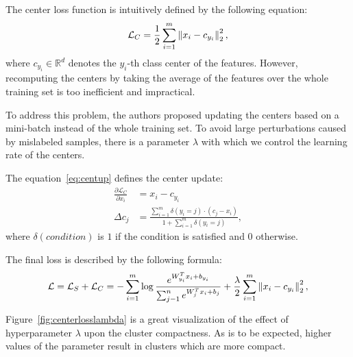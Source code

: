 The center loss function is intuitively defined by the following equation:
\begin{equation}
    \label{eq:center}
    \mathcal{L}_C = \frac{1}{2} \sum_{i=1}^{m} \left\lVert x_i - c_{y_i}\right\rVert_2^2,
\end{equation}
where $c_{y_i} \in \mathbb{R}^{d}$ denotes the $y_i$-th class center of the features.
However, recomputing the centers by taking the average of the features over the whole training set is too inefficient
and impractical.

To address this problem, the authors proposed updating the centers based on a mini-batch instead of the whole training
set.
To avoid large perturbations caused by mislabeled samples, there is a parameter $\lambda$ with which we control the
learning rate of the centers.

The equation~\ref{eq:centup} defines the center update:
\begin{align}
    \frac{\partial \mathcal{L}_C}{\partial x_i} &= x_i - c_{y_i} \\
    \Delta c_j &= \frac{\sum_{i=1}^m \delta(y_i=j) \cdot (c_j-x_i)}{1+\sum_{i=1}^m \delta(y_i=j)}, \label{eq:centup}
\end{align}
where $\delta(condition)$ is $1$ if the condition is satisfied and $0$ otherwise.

The final loss is described by the following formula:
\begin{equation}
    \label{eq:centerloss}
    \mathcal{L} = \mathcal{L}_S + \mathcal{L}_C = -\sum_{i=1}^{m} \log \frac{e^{W^T_{y_i} x_{i} + b_{y_i}}}
    {\sum_{j-1}^{n} e^{W^T_{j} x_{i} + b_{j}}} + \frac{\lambda}{2} \sum_{i=1}^{m} \left\lVert x_i - c_{y_i}\right\rVert_2^2,
\end{equation}

Figure~\ref{fig:centerlosslambda} is a great visualization of the effect of hyperparameter $\lambda$ upon the cluster
compactness.
As is to be expected, higher values of the parameter result in clusters which are more compact.

